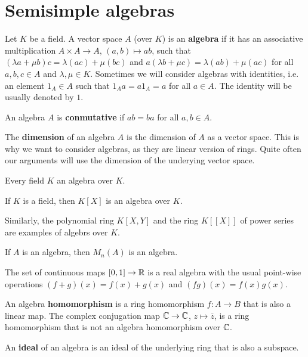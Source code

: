 \chapter{Semisimple algebras}

Let $K$ be a field. A vector space $A$ (over $K$) is an \textbf{algebra} if it has an associative multiplication
$A\times A\to A$, $(a,b)\mapsto ab$, such that 
$(\lambda a+\mu b)c=\lambda(ac)+\mu(bc)$ and  
$a(\lambda b+\mu c)=\lambda(ab)+\mu(ac)$ 
for all $a,b,c\in A$ and $\lambda,\mu\in K$. Sometimes we will consider algebras with identities, i.e. 
an element $1_A\in A$ such that $1_Aa=a1_A=a$
for all $a\in A$. The identity will be usually denoted by $1$. 

An algebra $A$ is \textbf{conmutative} if $ab=ba$ for all $a,b\in A$. 

The \textbf{dimension} of an algebra $A$ is the dimension of $A$ as a vector space. This is why we want to consider algebras, as 
they are linear version of rings. Quite often our arguments will use the dimension of the underying vector space.  

\begin{example}
	Every field $K$ an algebra over $K$. 
\end{example}

\begin{example}
	If $K$ is a field, then $K[X]$ is an algebra over $K$. 
\end{example}

Similarly, the polynomial ring $K[X,Y]$ and the ring $K[[X]]$ of power series are examples of algebrs over $K$. 

\begin{example}
	If $A$ is an algebra, then  $M_n(A)$ is an algebra. 
\end{example}

\begin{example}
    The set of continuous maps $[0,1]\to\mathbb{R}$ is a real algebra with the usual point-wise operations $(f+g)(x)=f(x)+g(x)$ and $(fg)(x)=f(x)g(x)$. 
\end{example}

An algebra \textbf{homomorphism} is a ring homomorphism $f\colon A\to B$ that is also a linear map. The complex conjugation map  
$\mathbb{C}\to \mathbb{C}$, $z\mapsto\overline{z}$, is a ring homomorphism that is not an algebra homomorphism over $\mathbb{C}$. 

\begin{definition}
	An \textbf{ideal} of an algebra is an ideal of the underlying ring that is also a subspace.
\end{definition}

